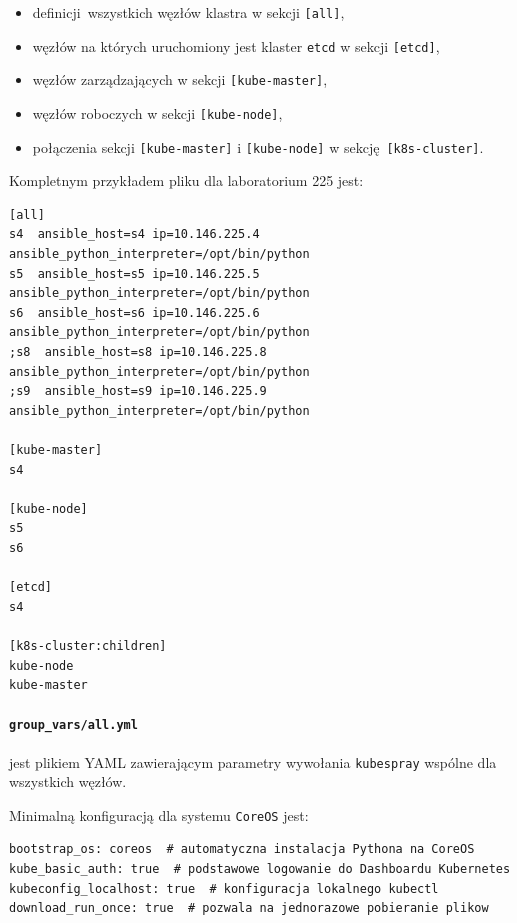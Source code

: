 \documentclass[a4paper,12pt,twoside,openany]{report}
\providecommand{\tightlist}{%
  \setlength{\itemsep}{0pt}\setlength{\parskip}{0pt}}
\newcommand{\passthrough}[1]{#1}
\begin{document}
\begin{itemize}
\tightlist
\item
  definicji~wszystkich węzłów klastra w sekcji
  \passthrough{\lstinline![all]!},
\item
  węzłów na których uruchomiony jest klaster
  \passthrough{\lstinline!etcd!} w sekcji
  \passthrough{\lstinline![etcd]!},
\item
  węzłów zarządzających w sekcji
  \passthrough{\lstinline![kube-master]!},
\item
  węzłów roboczych w sekcji \passthrough{\lstinline![kube-node]!},
\item
  połączenia sekcji \passthrough{\lstinline![kube-master]!} i
  \passthrough{\lstinline![kube-node]!} w
  sekcję~\passthrough{\lstinline![k8s-cluster]!}.
\end{itemize}

Kompletnym przykładem pliku dla laboratorium 225 jest:

\begin{lstlisting}
[all]
s4  ansible_host=s4 ip=10.146.225.4 ansible_python_interpreter=/opt/bin/python
s5  ansible_host=s5 ip=10.146.225.5 ansible_python_interpreter=/opt/bin/python
s6  ansible_host=s6 ip=10.146.225.6 ansible_python_interpreter=/opt/bin/python
;s8  ansible_host=s8 ip=10.146.225.8 ansible_python_interpreter=/opt/bin/python
;s9  ansible_host=s9 ip=10.146.225.9 ansible_python_interpreter=/opt/bin/python

[kube-master]
s4

[kube-node]
s5
s6 

[etcd]
s4

[k8s-cluster:children]
kube-node
kube-master
\end{lstlisting}

\hypertarget{group_varsall.yml}{%
\paragraph{\texorpdfstring{\texttt{group\_vars/all.yml}}{group\_vars/all.yml}}\label{group_varsall.yml}}

jest plikiem YAML zawierającym parametry wywołania
\passthrough{\lstinline!kubespray!} wspólne dla wszystkich węzłów.

Minimalną konfiguracją dla systemu \passthrough{\lstinline!CoreOS!}
jest:

\begin{lstlisting}
bootstrap_os: coreos  # automatyczna instalacja Pythona na CoreOS
kube_basic_auth: true  # podstawowe logowanie do Dashboardu Kubernetes
kubeconfig_localhost: true  # konfiguracja lokalnego kubectl
download_run_once: true  # pozwala na jednorazowe pobieranie plikow 
\end{lstlisting}
\end{document}

